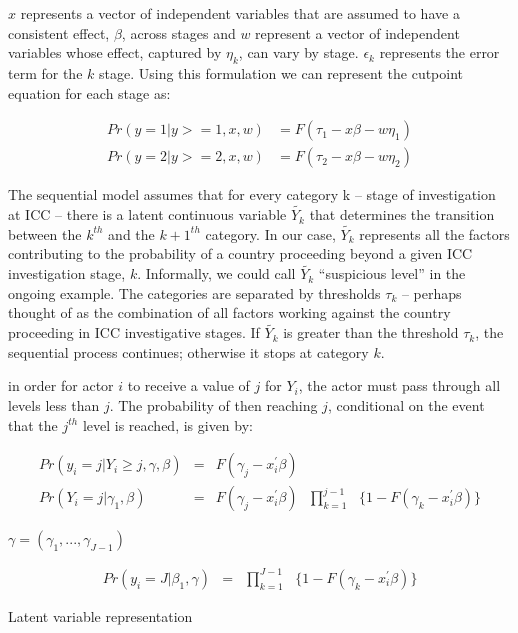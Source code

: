 $x$ represents a vector of independent variables that are assumed to have a consistent effect, $\beta$, across stages and $w$ represent a vector of independent variables whose effect, captured by $\eta_{k}$, can vary by stage. $\epsilon_{k}$ represents the error term for the $k$ stage. Using this formulation we can represent the cutpoint equation for each stage as:

\begin{align}
	Pr(y = 1 | y >= 1, x, w) &= F(\tau_{1} - x\beta - w\eta_{1}) \\
	Pr(y = 2 | y >= 2, x, w) &= F(\tau_{2} - x\beta - w\eta_{2})
\end{align}

The sequential model assumes that for every category k -- stage of investigation at ICC -- there is a latent continuous variable $\tilde{Y_{k}}$ that determines the transition between the $k^{th}$ and the $k+1^{th}$ category. In our case, $\tilde{Y_{k}}$ represents all the factors contributing to the probability of a country proceeding beyond a given ICC investigation stage, $k$. Informally, we could call $\tilde{Y_{k}}$ ``suspicious level'' in the ongoing example. The categories are separated by thresholds $\tau_{k}$ -- perhaps thought of as the combination of all factors working against the country proceeding in ICC investigative stages. If $\tilde{Y_{k}}$ is greater than the threshold $\tau_{k}$, the sequential process continues; otherwise it stops at category $k$.

in order for actor $i$ to receive a value of $j$ for $Y_{i}$, the actor must pass through all levels less than $j$. The probability of then reaching $j$, conditional on the event that the $j^{th}$ level is reached, is given by:

\begin{eqnarray}
	Pr(y_{i}={j} | Y_{i} \geq {j}, \gamma, \beta) &=& F(\gamma_{j} - x_{i}^{'}\beta) \nonumber \\
	Pr(Y_{i}={j}|\gamma_{1},\beta) &=& F(\gamma_{j} - x_{i}^{'}\beta)\text{ }\prod^{j-1}_{k=1}\text{ }\{1-F(\gamma_{k}-x_{i}^{'}\beta)\} \nonumber
\end{eqnarray}

$\gamma = (\gamma_{1},...,\gamma_{J-1})$

\begin{eqnarray}
	Pr(y_{i}=J|\beta_{1},\gamma) &=&\text{}\prod^{J-1}_{k=1}\text{ }\{1-F(\gamma_{k}-x_{i}^{'}\beta)\} \nonumber
\end{eqnarray}

Latent variable representation

